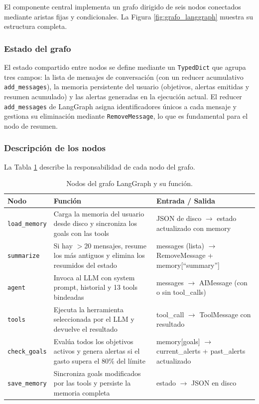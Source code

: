 El componente central implementa un grafo dirigido de seis nodos conectados mediante aristas fijas y condicionales. La Figura \ref{fig:grafo_langgraph} muestra su estructura completa.

\newpage
\subsubsection{Estado del grafo}

El estado compartido entre nodos se define mediante un \texttt{TypedDict} que agrupa tres campos: la lista de mensajes de conversación (con un reducer acumulativo \texttt{add\_messages}), la memoria persistente del usuario (objetivos, alertas emitidas y resumen acumulado) y las alertas generadas en la ejecución actual. El reducer \texttt{add\_messages} de LangGraph asigna identificadores únicos a cada mensaje y gestiona su eliminación mediante \texttt{RemoveMessage}, lo que es fundamental para el nodo de resumen.

\subsubsection{Descripción de los nodos}

La Tabla \ref{tab:nodos} describe la responsabilidad de cada nodo del grafo.

\begin{table}[h]
\centering
\caption{Nodos del grafo LangGraph y su función.}
\label{tab:nodos}
\begin{tabular}{@{}lp{4cm}p{5.5cm}@{}}
\toprule
\textbf{Nodo} & \textbf{Función} & \textbf{Entrada / Salida} \\
\midrule
\texttt{load\_memory} & Carga la memoria del usuario desde disco y sincroniza los goals con las tools & JSON de disco $\rightarrow$ estado actualizado con memory \\
\addlinespace
\texttt{summarize} & Si hay $>$20 mensajes, resume los más antiguos y elimina los resumidos del estado & messages (lista) $\rightarrow$ RemoveMessage + memory[``summary''] \\
\addlinespace
\texttt{agent} & Invoca al LLM con system prompt, historial y 13 tools bindeadas & messages $\rightarrow$ AIMessage (con o sin tool\_calls) \\
\addlinespace
\texttt{tools} & Ejecuta la herramienta seleccionada por el LLM y devuelve el resultado & tool\_call $\rightarrow$ ToolMessage con resultado \\
\addlinespace
\texttt{check\_goals} & Evalúa todos los objetivos activos y genera alertas si el gasto supera el 80\% del límite & memory[goals] $\rightarrow$ current\_alerts + past\_alerts actualizado \\
\addlinespace
\texttt{save\_memory} & Sincroniza goals modificados por las tools y persiste la memoria completa & estado $\rightarrow$ JSON en disco \\
\bottomrule
\end{tabular}
\end{table}

